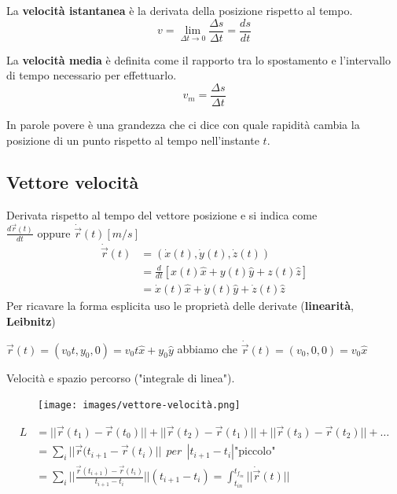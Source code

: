 \begin{definition}
    La \textbf{velocità istantanea} è la derivata della posizione rispetto al tempo.
    $$v = \lim_{\Delta t \to 0}\frac{\Delta s}{\Delta t} = \frac{ds}{dt}$$
\end{definition}

\begin{definition}
    La \textbf{velocità media} è definita come il rapporto tra lo spostamento e l'intervallo di tempo necessario per effettuarlo.
    $$v_m = \frac{\Delta s}{\Delta t}$$
\end{definition}
\hspace{-15pt}In parole povere è una grandezza che ci dice con quale rapidità cambia la posizione di un punto rispetto al tempo nell'instante $t$.
\subsection*{Vettore velocità}
Derivata rispetto al tempo del vettore posizione e si indica come 
$\frac{d\vec{r}(t)}{dt}\text{ oppure }\dot{\vec{r}}(t)[m/s]$
\begin{equation}
    \begin{split}
    \dot{\vec{r}}(t) & = (\dot{x}(t), \dot{y}(t), \dot{z}(t)) \\
     & = \frac{d}{dt}[x(t)\hat{x} + y(t)\hat{y} + z(t)\hat{z}] \\
     & = \dot{x}(t)\hat{x} + \dot{y}(t)\hat{y} + \dot{z}(t)\hat{z}
    \end{split}
\end{equation}
Per ricavare la forma esplicita uso le proprietà delle derivate (\textbf{linearità}, \textbf{Leibnitz})
\begin{example}
    $\vec{r}(t) = (v_0t, y_0, 0) = v_0t\hat{x} + y_0\hat{y}$ \:\:\:abbiamo che \:\:\:
    $\dot{\vec{r}}(t) = (v_0, 0, 0) = v_0 \hat{x}$
\end{example}
\hspace{-15pt}Velocità e spazio percorso ("integrale di linea").\\
\begin{figure}
    \centering
    \texttt{[image: images/vettore-velocità.png]}
\end{figure}
\begin{align*}
    L & = ||\vec{r}(t_1) - \vec{r}(t_0)|| + ||\vec{r}(t_2) - \vec{r}(t_1)|| + ||\vec{r}(t_3) - \vec{r}(t_2)|| + \dots \\
    & = \sum_i ||\vec{r}(t_{i+1} - \vec{r}(t_i)|| \:\: per\:\: |t_{i+1} - t_i| \text{"piccolo"} \\
    & = \sum_i ||\frac{\vec{r}(t_{i+1}) - \vec{r}(t_i)}{t_{i+1} - t_i}|| (t_{i+1} - t_i) = \int_{t_{in}}^{t_{f_{in}}}||\dot{\vec{r}}(t)||\\
\end{align*}
